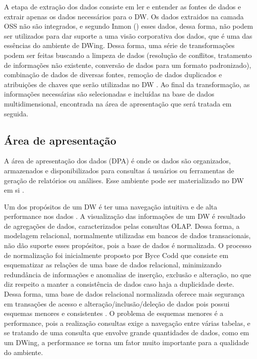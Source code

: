 %

A etapa de extração dos dados consiste em ler e entender as fontes de dados e extrair apenas os dados necessários para o DW. Os dados extraidos na camada OSS não são integrados, e segundo Inmon (\citeyear{inmon2002}) esses dados, dessa forma, não podem ser utilizados para dar suporte a uma visão corporativa dos dados, que é uma das essências do ambiente de DWing. Dessa forma, uma série de transformações podem ser feitas buscando a limpeza de dados (resolução de conflitos, tratamento de informações não existente, conversão de dados para um formato padronizado), combinação de dados de diversas fontes, remoção de dados duplicados e atribuições de chaves que serão utilizadas no DW \cite{kimball2002}. Ao final da transformação, as informações necessárias são selecionadas e incluídas na base de dados multidimensional, encontrada na área de apresentação que será tratada em seguida.

\subsection{Área de apresentação}

A área de apresentação dos dados (DPA) é onde os dados são organizados, armazenados e disponibilizados para consultas á usuários ou ferramentas de geração de relatórios ou análises. Esse ambiente pode ser materializado no DW em si \cite{kimball2002}. 

%

Um dos propósitos de um DW é ter uma navegação intuitiva e de alta performance nos dados \cite{kimball2002}. A visualização das informações de um DW é resultado de agregações de dados, caracterizados pelas consultas OLAP. Dessa forma, a modelagem relacional, normalmente utilizadas em bancos de dados transacionais, não dão suporte esses propósitos, pois a base de dados é normalizada. O processo de normalização foi inicialmente proposto por Byce Codd  que consiste em esquematizar as relações de uma base de dados relacional, minimizando redundância de informações e anomalias de inserção, exclusão e alteração, no que diz respeito a manter a consistência de dados caso haja a duplicidade deste. Dessa forma, uma base de dados relacional normalizada oferece mais segurança em transações de acesso e alteração/inclusão/deleção de dados pois possui esquemas menores e consistentes \cite{elmasri2006}. O problema de esquemas menores é a performance, pois a realização consultas exige a navegação  entre várias tabelas, e se tratando de uma consulta que envolve grande quantidades de dados, como em um DWing, a performance se torna um fator muito importante para a qualidade do ambiente.


